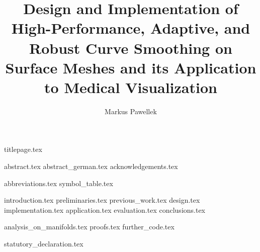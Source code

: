 \documentclass[fleqn,10pt,twoside]{stdglobal}
\title{Design and Implementation of High-Performance, Adaptive, and Robust Curve Smoothing on Surface Meshes and its Application to Medical Visualization}
\author{Markus Pawellek}
\let\oldpagenumbering\pagenumbering
\renewcommand*\pagenumbering[1]{\cleardoublepage\oldpagenumbering{#1}}
\begin{document}

  {titlepage.tex}

  {abstract.tex}
  \cleardoublepage
  {abstract_german.tex}
  {acknowledgements.tex}

  \tableofcontents
  \listoffigures
  \listoftables
  \listofmath
  {
    \small
    \listofcode
  }
  {abbreviations.tex}
  {symbol_table.tex}

  {introduction.tex}
  {preliminaries.tex}
  {previous_work.tex}
  {design.tex}
  {implementation.tex}
  {application.tex}
  {evaluation.tex}
  {conclusions.tex}

  \nocite{*}
  \printbibheading[heading=bibintoc]
  \printbibliography[heading=subbibliography,title={Books},type=book]
  \printbibliography[heading=subbibliography,title={Online Resources},type=online]
  \printbibliography[heading=subbibliography,title={General},nottype=book,nottype=online]

  \appendix
  {analysis_on_manifolds.tex}
  {proofs.tex}
  {further_code.tex}

  {statutory_declaration.tex}
\end{document}
